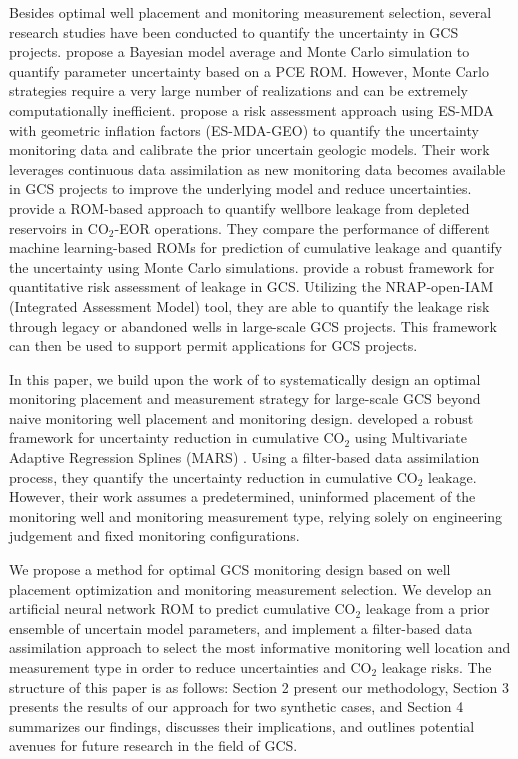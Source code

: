 \documentclass[10pt, twoside]{article}
\begin{document}
Besides optimal well placement and monitoring measurement selection, several research studies have been conducted to quantify the uncertainty in GCS projects. \citet{Jia2018104} propose a Bayesian model average and Monte Carlo simulation to quantify parameter uncertainty based on a PCE ROM. However, Monte Carlo strategies require a very large number of realizations and can be extremely computationally inefficient. \citet{Chen2020} propose a risk assessment approach using ES-MDA with geometric inflation factors (ES-MDA-GEO) to quantify the uncertainty monitoring data and calibrate the prior uncertain geologic models. Their work leverages continuous data assimilation as new monitoring data becomes available in GCS projects to improve the underlying model and reduce uncertainties. \citet{Mehana2022} provide a ROM-based approach to quantify wellbore leakage from depleted reservoirs in CO$_2$-EOR operations. They compare the performance of different machine learning-based ROMs for prediction of cumulative leakage and quantify the uncertainty using Monte Carlo simulations. \citet{Pawar2022} provide a robust framework for quantitative risk assessment of leakage in GCS. Utilizing the NRAP-open-IAM (Integrated Assessment Model) tool, they are able to quantify the leakage risk through legacy or abandoned wells in large-scale GCS projects. This framework can then be used to support permit applications for GCS projects. 

In this paper, we build upon the work of \citet{Chen2018} to systematically design an optimal monitoring placement and measurement strategy for large-scale GCS beyond naive monitoring well placement and monitoring design. \citet{Chen2018} developed a robust framework for uncertainty reduction in cumulative CO$_2$ using Multivariate Adaptive Regression Splines (MARS) \citep{Friedman19911}. Using a filter-based data assimilation process, they quantify the uncertainty reduction in cumulative CO$_2$ leakage. However, their work assumes a predetermined, uninformed placement of the monitoring well and monitoring measurement type, relying solely on engineering judgement and fixed monitoring configurations.

We propose a method for optimal GCS monitoring design based on well placement optimization and monitoring measurement selection. We develop an artificial neural network ROM to predict cumulative CO$_2$ leakage from a prior ensemble of uncertain model parameters, and implement a filter-based data assimilation approach to select the most informative monitoring well location and measurement type in order to reduce uncertainties and CO$_2$ leakage risks. The structure of this paper is as follows: Section 2 present our methodology, Section 3 presents the results of our approach for two synthetic cases, and Section 4 summarizes our findings, discusses their implications, and outlines potential avenues for future research in the field of GCS.
\end{document}
